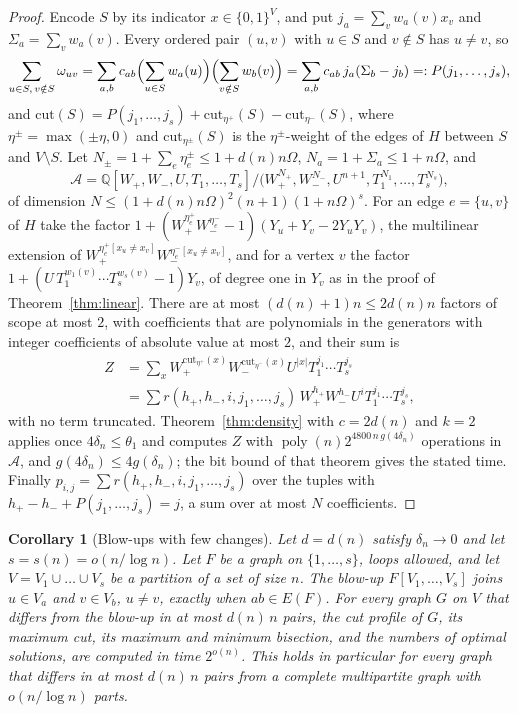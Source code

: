 \documentclass[11pt,reqno]{amsart}
\numberwithin{equation}{section}
\theoremstyle{plain}
\newtheorem{corollary}[theorem]{Corollary}
\theoremstyle{definition}
\theoremstyle{remark}
\DeclareMathOperator{\poly}{poly}
\newcommand{\A}{\mathcal{A}}
\newcommand{\Q}{\mathbb{Q}}
\begin{document}
\begin{proof}
Encode $S$ by its indicator $x\in\{0,1\}^V$, and put $j_a=\sum_vw_a(v)x_v$ and
$\Sigma_a=\sum_vw_a(v)$. Every ordered pair $(u,v)$ with $u\in S$ and $v\notin S$
has $u\ne v$, so
\begin{equation}\label{eq:lowrankcut}
  \sum_{u\in S,\,v\notin S}\omega_{uv}
  =\sum_{a,b}c_{ab}\Bigl(\sum_{u\in S}w_a(u)\Bigr)\Bigl(\sum_{v\notin S}w_b(v)\Bigr)
  =\sum_{a,b}c_{ab}\,j_a(\Sigma_b-j_b)=:P(j_1,\dots,j_s),
\end{equation}
and $\mathrm{cut}(S)=P(j_1,\dots,j_s)+\mathrm{cut}_{\eta^+}(S)-\mathrm{cut}_{\eta^-}(S)$,
where $\eta^{\pm}=\max(\pm\eta,0)$ and $\mathrm{cut}_{\eta^\pm}(S)$ is the
$\eta^\pm$-weight of the edges of $H$ between $S$ and $V\setminus S$. Let
$N_\pm=1+\sum_e\eta^\pm_e\le1+d(n)n\Omega$, $N_a=1+\Sigma_a\le1+n\Omega$, and
\[
  \A=\Q[W_+,W_-,U,T_1,\dots,T_s]\big/\bigl(W_+^{N_+},W_-^{N_-},U^{n+1},T_1^{N_1},\dots,T_s^{N_s}\bigr),
\]
of dimension $N\le(1+d(n)n\Omega)^2(n+1)(1+n\Omega)^s$. For an edge $e=\{u,v\}$ of $H$
take the factor $1+(W_+^{\eta^+_e}W_-^{\eta^-_e}-1)(Y_u+Y_v-2Y_uY_v)$, the multilinear
extension of $W_+^{\eta^+_e[x_u\ne x_v]}W_-^{\eta^-_e[x_u\ne x_v]}$, and for a vertex $v$
the factor $1+(U\,T_1^{w_1(v)}\cdots T_s^{w_s(v)}-1)Y_v$, of degree one in $Y_v$ as in
the proof of Theorem~\ref{thm:linear}. There are at most $(d(n)+1)n\le2d(n)n$ factors
of scope at most $2$, with coefficients that are polynomials in the generators with
integer coefficients of absolute value at most $2$, and their sum is
\begin{align*}
  Z&=\sum_xW_+^{\mathrm{cut}_{\eta^+}(x)}W_-^{\mathrm{cut}_{\eta^-}(x)}U^{|x|}T_1^{j_1}\cdots T_s^{j_s}\\
  &=\sum r(h_+,h_-,i,j_1,\dots,j_s)\,W_+^{h_+}W_-^{h_-}U^{i}T_1^{j_1}\cdots T_s^{j_s},
\end{align*}
with no term truncated. Theorem~\ref{thm:density} with $c=2d(n)$ and $k=2$ applies
once $4\delta_n\le\theta_1$ and computes $Z$ with $\poly(n)2^{4800\,n\,g(4\delta_n)}$
operations in $\A$, and $g(4\delta_n)\le4g(\delta_n)$; the bit bound of that theorem
gives the stated time. Finally
$p_{i,j}=\sum r(h_+,h_-,i,j_1,\dots,j_s)$ over the tuples with
$h_+-h_-+P(j_1,\dots,j_s)=j$, a sum over at most $N$ coefficients.
\end{proof}

\begin{corollary}[Blow-ups with few changes]\label{cor:blowup}
Let $d=d(n)$ satisfy $\delta_n\to0$ and let $s=s(n)=o(n/\log n)$. Let $F$ be a graph
on $\{1,\dots,s\}$, loops allowed, and let $V=V_1\cup\dots\cup V_s$ be a partition of a
set of size $n$. The blow-up $F[V_1,\dots,V_s]$ joins $u\in V_a$ and $v\in V_b$,
$u\ne v$, exactly when $ab\in E(F)$. For every graph $G$ on $V$ that differs from
the blow-up in at most $d(n)\,n$ pairs, the cut profile of $G$, its maximum cut, its
maximum and minimum bisection, and the numbers of optimal solutions, are computed in
time $2^{o(n)}$. This holds in particular for every graph that differs in at most
$d(n)\,n$ pairs from a complete multipartite graph with $o(n/\log n)$ parts.
\end{corollary}
\end{document}
